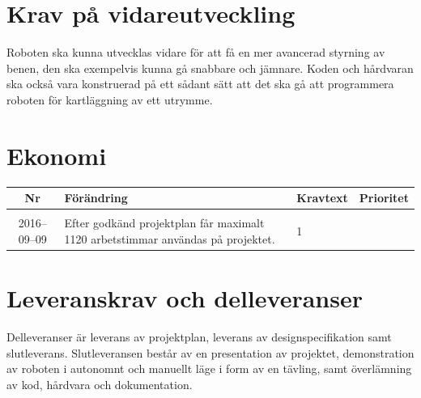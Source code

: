\documentclass[a4paper,titlepage,12pt]{article}
\newcounter{reqNr}
\newcounter{reqNrII}
\newcommand{\nextReqNrII}{\stepcounter{reqNrII}\arabic{reqNrII}}
\newcommand{\newRequirement}[1] {\pbox{5cm}{Tillagt \\#1}}
\begin{document}
	\section{Krav på vidareutveckling}
	Roboten ska kunna utvecklas vidare för att få en mer avancerad styrning av benen, 
	den ska exempelvis kunna gå snabbare och jämnare. Koden och hårdvaran ska också vara
	konstruerad på ett sådant sätt att det ska gå att programmera roboten för
	kartläggning av ett utrymme.

	\section{Ekonomi}

	\begin{longtable}[c]{ c l>{\raggedright}p{} l }
		\textbf{Nr} & \textbf{Förändring} & \textbf{Kravtext} & \textbf{Prioritet} 
		\\ \midrule
		
		\nextReqNrII{} & \newRequirement{2016--09--09} & Efter godkänd projektplan får
			maximalt 1120 arbetstimmar användas på projektet. & 1
	\end{longtable}

	\section{Leveranskrav och delleveranser}
	Delleveranser är leverans av projektplan, leverans av designspecifikation 
	samt slutleverans. Slutleveransen består av en presentation av projektet, 
	demonstration av roboten i autonomnt och manuellt läge i form av en tävling,
	samt överlämning av kod, hårdvara och dokumentation.
\end{document}
